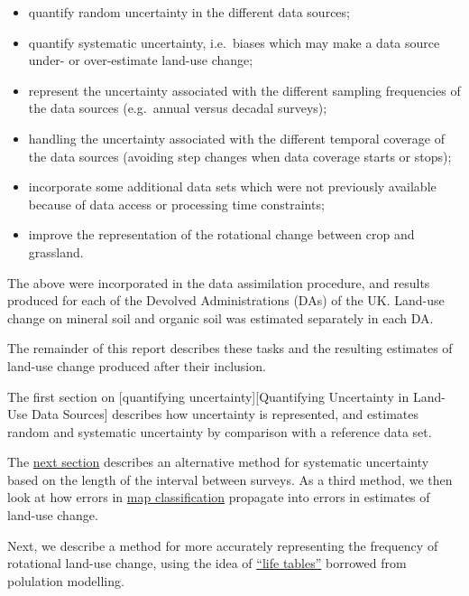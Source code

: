 \documentclass[
]{book}
\providecommand{\tightlist}{%
  \setlength{\itemsep}{0pt}\setlength{\parskip}{0pt}}
\begin{document}
\begin{itemize}
\tightlist
\item
  quantify random uncertainty in the different data sources;
\item
  quantify systematic uncertainty, i.e.~biases which may make a data source under- or over-estimate land-use change;
\item
  represent the uncertainty associated with the different sampling frequencies of the data sources (e.g.~annual versus decadal surveys);
\item
  handling the uncertainty associated with the different temporal coverage of the data sources (avoiding step changes when data coverage starts or stops);
\item
  incorporate some additional data sets which were not previously available because of data access or processing time constraints;
\item
  improve the representation of the rotational change between crop and grassland.
\end{itemize}

The above were incorporated in the data assimilation procedure, and results produced for each of the Devolved Administrations (DAs) of the UK. Land-use change on mineral soil and organic soil was estimated separately in each DA.

The remainder of this report describes these tasks and the resulting estimates of land-use change produced after their inclusion.

The first section on {[}quantifying uncertainty{]}{[}Quantifying Uncertainty in Land-Use Data Sources{]} describes how uncertainty is represented, and estimates random and systematic uncertainty by comparison with a reference data set.

The \protect\hyperlink{assessing-systematic-errors-in-estimates-of-land-use-change-sensitivity-to-survey-interval-length}{next section} describes an alternative method for systematic uncertainty based on the length of the interval between surveys.
As a third method, we then look at how errors in \protect\hyperlink{estimating-false-positive-rates-in-detection-of-land-use-change-based-on-classification-accuracy}{map classification} propagate into errors in estimates of land-use change.

Next, we describe a method for more accurately representing the frequency of rotational land-use change, using the idea of \protect\hyperlink{using-life-tables-in-modelling-land-use-change}{``life tables''} borrowed from polulation modelling.
\end{document}
